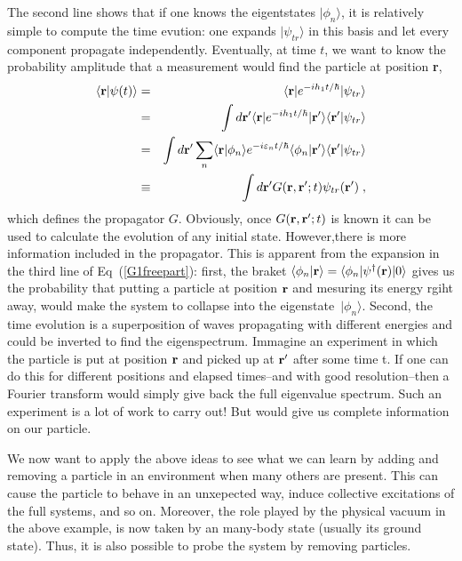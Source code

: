 The second line shows that if one knows the eigentstates $\vert \phi_n \rangle$, it is relatively simple to compute the time evution: one expands $\vert\psi_{tr}\rangle$ in this basis and let every component propagate independently. Eventually, at time $t$, we want to know the probability amplitude that a measurement would find the particle at position {\bf r},
\begin{eqnarray}
\langle {\bf r} \vert \psi(t) \rangle &=& \langle {\bf r} \vert e^{- i h_1 t /\hbar} \vert \psi_{tr} \rangle
\nonumber \\
             &=& \int d{\bf r}' \langle {\bf r} \vert e^{- i h_1 t /\hbar} \vert {\bf r}' \rangle \langle {\bf r}' \vert  \psi_{tr} \rangle
\nonumber \\
             &=&\int d{\bf r}'  \sum_n \langle {\bf r} \vert \phi_n \rangle e^{- i \varepsilon_n t /\hbar} 
             \langle \phi_n \vert {\bf r}' \rangle \langle {\bf r}' \vert  \psi_{tr} \rangle
\label{G1freepart} \\
             &\equiv& \int d{\bf r}' G({\bf r}, {\bf r}'; t) \psi_{tr}({\bf r}') \; ,
\nonumber 
\end{eqnarray}
which defines the propagator $G$. Obviously, once $G({\bf r}, {\bf r}'; t)$ is known it can be used to calculate the evolution of any initial state.
However,there is more information included in the propagator. This is apparent from the expansion in the third line of Eq~(\ref{G1freepart}): first, the braket $\langle \phi_n \vert {\bf r} \rangle=\langle \phi_n \vert \psi^\dag({\bf r}) \vert 0 \rangle$ gives us the probability that putting a particle at position ${\bf r}$ and mesuring its energy rgiht away, would make the system to collapse into the eigenstate~$\vert\phi_n\rangle$.  Second, the time evolution is a superposition of waves propagating with different energies and could be inverted to find the eigenspectrum.
Immagine an experiment  in which the particle is put at position ${\bf r}$ and picked up at ${\bf r}'$ after some time t. If one can do this for different positions and elapsed times--and with good resolution--then a Fourier transform would simply give back the full eigenvalue spectrum. Such an experiment is a lot of work to carry out! But would give us complete information on our particle.

We now want to apply the above ideas to see what we can learn by adding and removing a particle in an environment when many others are present. This can cause the particle to behave in an unxepected way, induce collective excitations of the full systems, and so on.   Moreover, the role played by the physical vacuum in the above example, is now taken by an many-body state (usually its ground state). Thus, it is also possible to probe the system by removing particles.

